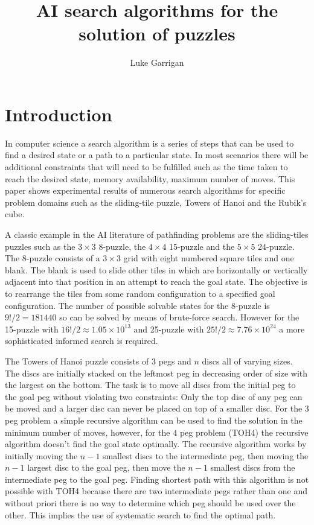 \documentclass[final]{cmpreport}
\title{AI search algorithms for the solution of puzzles}
\author{Luke Garrigan}
\begin{document}
\section{Introduction}



 In computer science a search algorithm is a series of steps that can be used to find a desired state or a path to a particular state. In most scenarios there will be additional constraints that will need to be fulfilled such as the time taken to reach the desired state, memory availability, maximum number of moves. This paper shows experimental results of numerous search algorithms for specific problem domains such as the sliding-tile puzzle, Towers of Hanoi and the Rubik's cube.

 A classic example in the AI literature of pathfinding problems are the sliding-tiles puzzles such as the $3\times3$ 8-puzzle, the $4\times4$ 15-puzzle and the $5\times5$ 24-puzzle. The 8-puzzle consists of a $3\times3$ grid with eight numbered square tiles and one blank. The blank is used to slide other tiles in which are horizontally or vertically adjacent into that position in an attempt to reach the goal state. The objective is to rearrange the tiles from some random configuration to a specified goal configuration. The number of possible solvable states for the 8-puzzle is $9!/2=181440$ so can be solved by means of brute-force search. However for the 15-puzzle with $16!/2\approx1.05\times10^{13}$ and 25-puzzle with $25!/2\approx7.76\times10^{24}$ a more sophisticated informed search is required.
 
 The Towers of Hanoi puzzle consists of $3$ pegs and $n$ discs all of varying sizes. The discs are initially stacked on the leftmost peg in decreasing order of size with the largest on the bottom. The task is to move all discs from the initial peg to the goal peg without violating two constraints: Only the top disc of any peg can be moved and a larger disc can never be placed on top of a smaller disc. For the $3$ peg problem a simple recursive algorithm can be used to find the solution in the minimum number of moves, however, for the $4$ peg problem (TOH4) the recursive algorithm doesn't find the goal state optimally. The recursive algorithm works by initially moving the $n-1$ smallest discs to the intermediate peg, then moving the $n-1$ largest disc to the goal peg, then move the $n-1$ smallest discs from the intermediate peg to the goal peg. Finding shortest path with this algorithm is not possible with TOH4 because there are two intermediate pegs rather than one and without priori there is no way to determine which peg should be used over the other. This implies the use of systematic search to find the optimal path.
 
\end{document}
